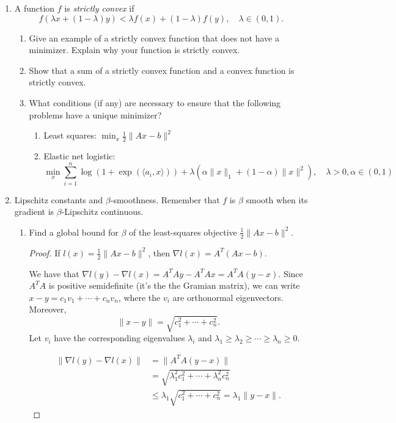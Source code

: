 \documentclass[11pt]{amsart}
\begin{document}
\begin{enumerate}
\bigskip\bigskip


\item A function $f$ is {\it strictly convex} if 
\[
f(\lambda x + (1-\lambda)y) < \lambda f(x) + (1-\lambda) f(y), \quad \lambda \in (0,1).
\]
\begin{enumerate}
\item Give an example of a strictly convex function that 
does not have a minimizer. Explain why your function is strictly convex. 
\item Show that a sum of a strictly convex function and a convex function is strictly convex. 
\item What conditions (if any) are necessary to ensure that the following problems have a unique minimizer?  
\begin{enumerate}
\item Least squares: $\min_x \frac{1}{2}\|Ax - b\|^2$
\item Elastic net logistic: 
\[
\min_x \sum_{i=1}^n \log(1 + \exp(\langle a_i, x\rangle)) + \lambda(\alpha \|x\|_1 + (1-\alpha)\|x\|^2), \quad \lambda>0, \alpha \in (0,1)
\]
\end{enumerate}
\end{enumerate}
\bigskip\bigskip



\item Lipschitz constants and $\beta$-smoothness. Remember that $f$ is $\beta$ smooth when 
its gradient is $\beta$-Lipschitz continuous.   
\begin{enumerate}
\item Find a global bound for $\beta$ of the least-squares objective $\frac{1}{2}\|Ax-b\|^2$.
  \begin{proof}
    If $l(x) = \frac{1}{2}\|Ax-b\|^2$, then $\nabla l(x) = A^T\left(Ax - b\right)$.
    
    We have that $\nabla l(y) - \nabla l(x) = A^TAy - A^TAx = A^TA(y -
    x)$. Since $A^TA$ is positive semidefinite (it's the the Gramian matrix), we
    can write $x - y = c_1v_1 + \cdots + c_nv_n$, where the $v_i$ are
    orthonormal eigenvectors. Moreover,
    $$\lVert x - y \rVert = \sqrt{c_1^2 + \cdots + c_n^2}.$$ Let $v_i$ have the
    corresponding eigenvalues $\lambda_i$ and
    $\lambda_1 \geq \lambda_2 \geq \cdots \geq \lambda_n \geq 0$.
    
    \begin{align*}
      \lVert \nabla l(y) - \nabla l(x) \rVert
      &= \lVert A^TA(y - x) \rVert \\
      &= \sqrt{\lambda_1^2c_1^2 + \cdots + \lambda_n^2c_n^2} \\
      &\leq \lambda_1 \sqrt{c_1^2 + \cdots + c_n^2} = \lambda_1\lVert y - x \rVert.
    \end{align*}


\end{proof}
\end{enumerate}
\end{enumerate}
\end{document}
